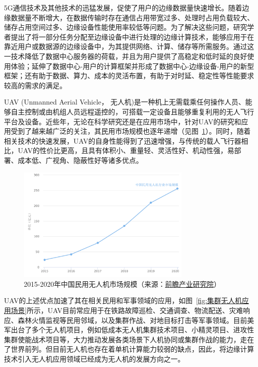 5G通信技术及其他技术的迅猛发展，促使了用户的边缘数据量快速增长。随着边缘数据量不断增大，在数据传输时存在通信占用带宽过多、处理时占用负载较大、储存占用空间过多、边缘设备性能使用率较低等问题。为了解决这些问题，研究学者提出了将一部分任务分配至边缘设备中进行处理的边缘计算技术，能够应用于在靠近用户或数据源的边缘设备中，为其提供网络、计算、储存等所需服务。通过这一技术降低了数据中心服务器的荷载，并且为用户提供了高稳定和低时延的良好使用体验；延伸了数据中心-用户的计算框架并形成了数据中心-边缘设备-用户的新型框架；还有助于数据、算力、成本的灵活布置，有助于对时延、稳定性等性能要求较高的需求的满足。

UAV (Unmanned Aerial Vehicle， 无人机)是一种机上无需载乘任何操作人员、能够自主控制或由机组人员远程遥控的，可搭载一定设备且能够重复利用的无人飞行平台及设备。近些年，无论在科学研究还是在应用市场中，针对UAV的研究和应用受到了越来越广泛的关注，其民用市场规模也逐年递增（见图~\ref{fig:2015-2020年中国民用无人机市场规模}）。同时，随着相关技术的快速发展，UAV的自身性能得到了迅速增强，与传统的载人飞行器相比，UAV的性价比更高，且具有体积小、重量轻、灵活性好、机动性强，易部署、成本低、广视角、隐蔽性好等诸多优点。

\begin{figure}[!htbp]
    \centering
    \includegraphics[width=0.75\textwidth]{images/2015-2020年中国民用无人机市场规模.pdf}
    \caption{2015-2020年中国民用无人机市场规模（来源：\href{https://bg.qianzhan.com/trends/detail/506/220215-4753a4d9.html}{前瞻产业研究院}）}
    \label{fig:2015-2020年中国民用无人机市场规模}
\end{figure}

UAV的上述优点加速了其在相关民用和军事领域的应用，如图~\ref{fig:集群无人机应用场景}所示，UAV目前常应用于在铁路故障巡检、交通调查、物流配送\citep{peng2019HybridGeneticAlgorithma}、灾难响应\citep{yang2020MaritimeSearchRescuea}、森林火情监视等民用邻域，以及集群作战\citep{liu2018MeiJunZhuYaoWuRenJiJiQunXiangMuFaZhanQianXia}、对地目标打击等军事领域。目前美军出台了多个无人机项目，例如低成本无人机集群技术项目、小精灵项目、进攻性集群使能战术项目等，大力推动发展各类场景下人机协同或集群作战的能力，走在了世界前列\citep{liu2018MeiJunZhuYaoWuRenJiJiQunXiangMuFaZhanQianXia}。但目前无人机也存在着单机计算能力较弱的缺点\citep{yao2013WuRenJiQunXieTongZuoZhanRenWuFenPeiFangFaYanJiu}，因此，将边缘计算技术引入无人机应用领域已经成为无人机的发展方向之一。


